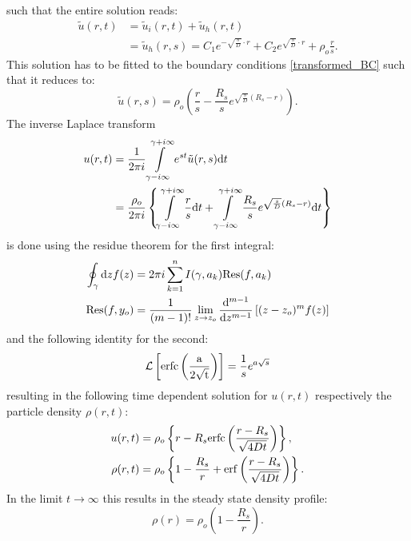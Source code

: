 such that the entire solution reads:
\begin{align}
    \tilde{u}(r,t)&=\tilde{u}_{i}(r,t)+\tilde{u}_{h}(r,t) \nonumber \\
    &= \tilde{u}_h(r,s) = C_1 e^{ - \sqrt{\frac{s}{D}} \cdot r } + C_2 e^{ \sqrt{\frac{s}{D}} \cdot r } + \rho_o\frac{r}{s} .
\end{align}
This solution has to be fitted to the boundary conditions \eqref{transformed_BC} such that it reduces to:
\begin{equation}
    \tilde{u}(r,s) = \rho_o \left( \frac{r}{s} - \frac{R_s}{s} e^{ \sqrt{\frac{s}{D}}(R_s - r) } \right) .
\end{equation}
The inverse Laplace transform
\begin{align}
    u(r,t)  &= \frac{1}{2 \pi i} \int\limits_{\gamma - i \infty}^{\gamma + i \infty}  e^{st} \tilde{u}(r,s){\rm d}t \\
    &= \frac{\rho_o}{ 2 \pi i} \left\{  \int\limits_{\gamma - i \infty}^{\gamma + i \infty} \frac{r}{s}  {\rm d}t +  \int\limits_{\gamma - i \infty}^{\gamma + i \infty}\frac{R_s}{s} e^{ \sqrt{\frac{s}{D}}(R_s - r) }  {\rm d}t \right\}
    \label{inverse laplace}
\end{align}
is done using the residue theorem for the first integral:
\begin{align}
    \oint_{ \gamma } {\rm d}z f(z) &= 2 \pi i \sum_{k = 1}^{n}I(\gamma, a_k) {\rm Res}(f,a_k) \\
    { \rm Res}(f,y_o) &= \frac{1}{(m-1)!} \lim_{z\rightarrow z_o} \frac{{ \rm d} ^{m-1}}{{\rm d} z^{m-1}} \left[ (z - z_o)^{m}f(z) \right]
    \label{residue theorem}
\end{align}
and the following identity for the second:
\begin{equation}
    \mathcal{L}\left[ {\rm erfc\left( \frac{a}{2\sqrt{t}} \right)} \right] = \frac{1}{s}e^{a\sqrt{s}}
    \label{L(erfc)}
\end{equation}
resulting in the following time dependent solution for $u(r,t)$ respectively the particle density $\rho(r,t)$:
\begin{align}
    u(r,t) &= \rho_o \left\{ r - R_s {\rm erfc} \left( \frac{r - R_s}{\sqrt{4 D t}} \right) \right\}, \\
    \rho(r,t) &= \rho_o \left\{ 1 - \frac{R_s}{r} + {\rm erf} \left( \frac{r - R_s}{\sqrt{4Dt}} \right) \right\}.
    \label{u(r,t)}
\end{align}
In the limit $t \rightarrow \infty$ this results in the steady state density profile:
\begin{equation}
    \rho(r) =  \rho_o \left( 1 - \frac{R_s}{r} \right).
    \label{steady_state_density}
\end{equation}
